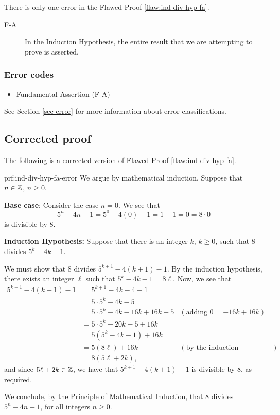 There is only one error
 in the Flawed Proof \ref{flaw:ind-div-hyp-fa}. 
 
 
 \begin{description}
 	\item[F-A] In the Induction Hypothesis, the entire result that we are attempting to prove is asserted.  %
 \end{description}

 
\subsubsection{Error codes}
\begin{itemize}
	\item 	Fundamental Assertion (F-A)
\end{itemize}
See Section \ref{sec-error} for more information about error classifications.

\clearpage
\subsection{Corrected proof}

The following is a corrected version of Flawed Proof \ref{flaw:ind-div-hyp-fa}. 

\begin{prf}{prf:ind-div-hyp-fa-error}
We argue by mathematical induction.
Suppose that $n \in \mathbb Z$, $n\geq 0$.

\noindent \textbf{Base case}: Consider the case $n=0$.  We see that 
\[ 5^n - 4n - 1 = 5^0 - 4(0) - 1 = 1-1 = 0 = 8\cdot 0 \]
is divisible by $8$.

\noindent \textbf{Induction Hypothesis:} Suppose that there is an integer $k$, $k\geq 0$, such that $8$ divides $5^k - 4k -1$.

We must show that $8$ divides $5^{k+1} - 4(k+1) -1$.
By the induction hypothesis, there exists an integer $\ell$ such that $5^k-4k-1 = 8\ell$.
Now, we see that
\begin{align*}
	5^{k+1} - 4(k+1) -1 & = 5^{k+1} - 4k -4 - 1 \\
	& = 5\cdot 5^k -4k -5 \\
	& = 5\cdot 5^k -4k - 16k + 16k -5 & (\text{adding $0=-16k+16k$})\\
	& = 5\cdot 5^k - 20k - 5 + 16k \\
	& = 5(5^k -4k -1) + 16 k \\
	& = 5(8\ell) + 16 k & (\text{by the induction hypothesis})\\
	& = 8(5\ell + 2k),
\end{align*}
and since $5\ell + 2k \in \mathbb Z$, we have that $5^{k+1} - 4(k+1) -1$ is divisible by $8$, as required.

We conclude, by the Principle of Mathematical Induction, that $8$ divides $5^n-4n-1$, for all integers $n\geq 0$.
\end{prf}